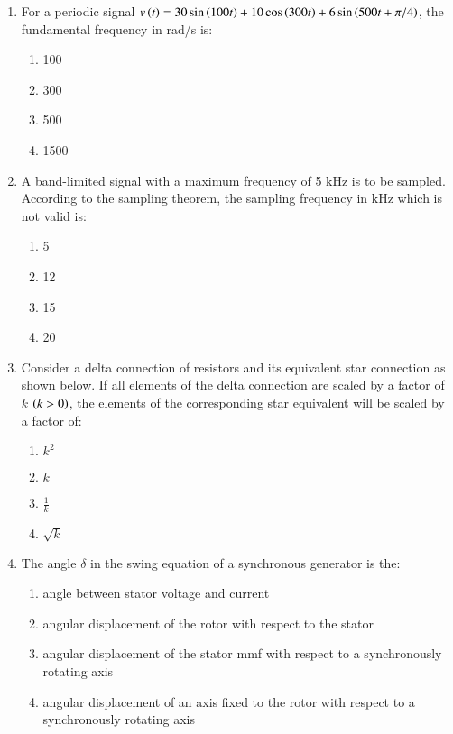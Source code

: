 \documentclass[journal,9pt,onecolumn]{IEEEtran}
\begin{document}
\begin{enumerate}
\item For a periodic signal $v\left(t\right) = 30 \sin\left(100t\right) + 10 \cos\left(300t\right) + 6 \sin\left(500t + \pi/4\right)$, the fundamental frequency in rad/s is:

\begin{multicols}{4}
    \begin{enumerate}
        \item 100
        \item 300
        \item 500
        \item 1500
    \end{enumerate}
\end{multicols}

\item A band-limited signal with a maximum frequency of 5 kHz is to be sampled. According to the sampling theorem, the sampling frequency in kHz which is not valid is:

\begin{multicols}{4}
    \begin{enumerate}
        \item 5
        \item 12
        \item 15
        \item 20
    \end{enumerate}
\end{multicols}

\item Consider a delta connection of resistors and its equivalent star connection as shown below. If all elements of the delta connection are scaled by a factor of $k$ $\left(k>0\right)$, the elements of the corresponding star equivalent will be scaled by a factor of:
\begin{multicols}{2}
    
    
\end{multicols}
\begin{multicols}{4}
    \begin{enumerate}
        \item $k^2$
        \item $k$
        \item $\frac{1}{k}$
        \item $\sqrt{k}$
    \end{enumerate}
\end{multicols}

    
\item The angle $\delta$ in the swing equation of a synchronous generator is the:
    \begin{enumerate}
        \item angle between stator voltage and current
        \item angular displacement of the rotor with respect to the stator
        \item angular displacement of the stator mmf with respect to a synchronously rotating axis
        \item angular displacement of an axis fixed to the rotor with respect to a synchronously rotating axis
    \end{enumerate}


\end{enumerate}
\end{document}
